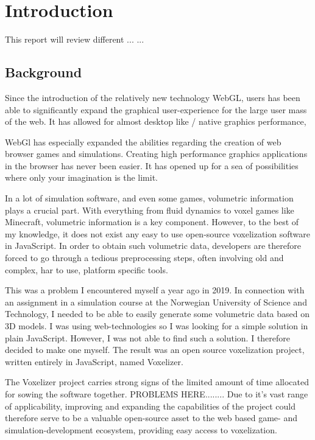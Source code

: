 \chapter[Introductions]{Introduction}

This report will review different ...
...\\

\section{Background}
Since the introduction of the relatively new technology WebGL, users has been able to significantly expand the graphical user-experience for the large user mass of the web. It has allowed for almost desktop like / native graphics performance, 

WebGl has especially expanded the abilities regarding the creation of web browser games and simulations. Creating high performance graphics applications in the browser has never been easier. It has opened up for a sea of possibilities where only your imagination is the limit.

In a lot of simulation software, and even some games, volumetric information plays a crucial part. With everything from fluid dynamics to voxel games like Minecraft, volumetric information is a key component. However, to the best of my knowledge, it does not exist any easy to use open-source voxelization software in JavaScript. In order to obtain such volumetric data, developers are therefore forced to go through a tedious preprocessing steps, often involving old and complex, har to use, platform specific tools.

This was a problem I encountered myself a year ago in 2019. In connection with an assignment in a simulation course at the Norwegian University of Science and Technology, I needed to be able to easily generate some volumetric data based on 3D models. I was using web-technologies so I was looking for a simple solution in plain JavaScript. However, I was not able to find such a solution. I therefore decided to make one myself. The result was an open source voxelization project, written entirely in JavaScript, named Voxelizer.

The Voxelizer project carries strong signs of the limited amount of time allocated for sowing the software together. PROBLEMS HERE........ Due to it's vast range of applicability, improving and expanding the capabilities of the project could therefore serve to be a valuable open-source asset to the web based game- and simulation-development ecosystem, providing easy access to voxelization.

